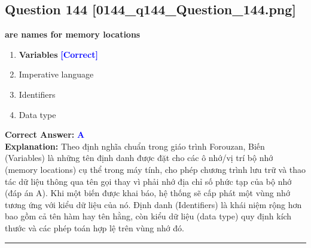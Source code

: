 \documentclass[11pt,a4paper]{article}
\begin{document}
\begin{minipage}{\textwidth}
\subsection*{Question 144 \quad \footnotesize{[0144\_q144\_Question\_144.png]}}
\noindent \textbf{are names for memory locations}

\begin{enumerate}[label=\Alph*.]
    \item \textbf{Variables} \hfill \textcolor{blue}{\textbf{[Correct]}}
    \item Imperative language
    \item Identifiers
    \item Data type
\end{enumerate}

\noindent \textbf{Correct Answer:} \textcolor{blue}{\textbf{A}} \\[2pt]
\noindent \textbf{Explanation:} Theo định nghĩa chuẩn trong giáo trình Forouzan, Biến (Variables) là những tên định danh được đặt cho các ô nhớ/vị trí bộ nhớ (memory locations) cụ thể trong máy tính, cho phép chương trình lưu trữ và thao tác dữ liệu thông qua tên gọi thay vì phải nhớ địa chỉ số phức tạp của bộ nhớ (đáp án A). Khi một biến được khai báo, hệ thống sẽ cấp phát một vùng nhớ tương ứng với kiểu dữ liệu của nó. Định danh (Identifiers) là khái niệm rộng hơn bao gồm cả tên hàm hay tên hằng, còn kiểu dữ liệu (data type) quy định kích thước và các phép toán hợp lệ trên vùng nhớ đó.

\par\vspace{0.3cm}
\hrule
\vspace{0.3cm}
\end{minipage}
\end{document}

